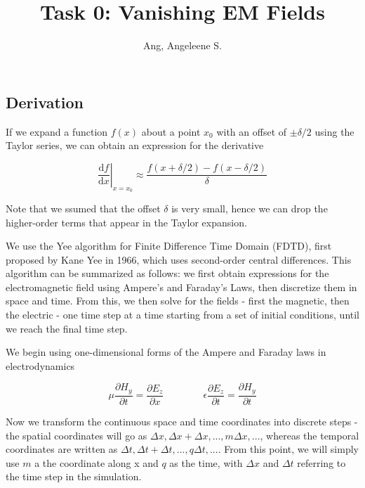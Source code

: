 \documentclass{article}
\title{Task 0: Vanishing EM Fields}
\author{Ang, Angeleene S.}
\begin{document}
    
    
    \maketitle
    
    

    
\subsection*{Derivation}\label{derivation}

If we expand a function \(f(x)\) about a point \(x_0\) with an offset of
\(\pm \delta/2\) using the Taylor series, we can obtain an expression
for the derivative

\begin{equation}
\left . \dfrac{ \mathrm{d} f}{\mathrm{d} x} \right |_{x=x_0} \approx \dfrac{ f(x+\delta/2) - f(x-\delta/2) }{\delta}
\end{equation}

Note that we ssumed that the offset \(\delta\) is very small, hence we
can drop the higher-order terms that appear in the Taylor expansion.

We use the Yee algorithm for Finite Difference Time Domain (FDTD), first
proposed by Kane Yee in 1966, which uses second-order central
differences. This algorithm can be summarized as follows: we first
obtain expressions for the electromagnetic field using Ampere's and
Faraday's Laws, then discretize them in space and time. From this, we
then solve for the fields - first the magnetic, then the electric - one
time step at a time starting from a set of initial conditions, until we
reach the final time step.

We begin using one-dimensional forms of the Ampere and Faraday laws in
electrodynamics

\begin{equation}
\mu \dfrac{\partial H_y}{\partial t} = \dfrac{\partial E_z}{\partial x}
\qquad\qquad
\epsilon \dfrac{\partial E_z}{\partial t} = \dfrac{\partial H_y}{\partial t}
\end{equation}

    Now we transform the continuous space and time coordinates into discrete
steps - the spatial coordinates will go as
\({ \Delta x, \Delta x + \Delta x,..., m\Delta x, ...}\), whereas the
temporal coordinates are written as
\({ \Delta t, \Delta t + \Delta t,..., q\Delta t, ...}\). From this
point, we will simply use \(m\) a the coordinate along x and \(q\) as
the time, with \(\Delta x\) and \(\Delta t\) referring to the time step
in the simulation.
\end{document}
